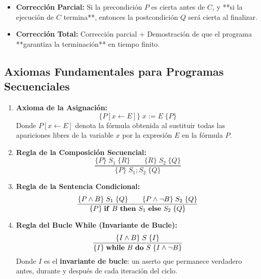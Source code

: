 \begin{definicion}
\begin{itemize}[leftmargin=*]
    \item \textbf{Corrección Parcial:} Si la precondición $P$ es cierta antes de $C$, y **si la ejecución de $C$ termina**, entonces la postcondición $Q$ será cierta al finalizar.
    \item \textbf{Corrección Total:} Corrección parcial + Demostración de que el programa **garantiza la terminación** en tiempo finito.
\end{itemize}
\end{definicion}

\subsection{Axiomas Fundamentales para Programas Secuenciales}
\begin{enumerate}[leftmargin=*]
    \item \textbf{Axioma de la Asignación:}
    \begin{equation}
    \{P[x \leftarrow E]\} \; x := E \; \{P\}
    \end{equation}
    Donde $P[x \leftarrow E]$ denota la fórmula obtenida al sustituir todas las apariciones libres de la variable $x$ por la expresión $E$ en la fórmula $P$.
    
    \item \textbf{Regla de la Composición Secuencial:}
    \begin{equation}
    \frac{\{P\} \; S_1 \; \{R\} \quad\quad \{R\} \; S_2 \; \{Q\}}{\{P\} \; S_1; S_2 \; \{Q\}}
    \end{equation}
    
    \item \textbf{Regla de la Sentencia Condicional:}
    \begin{equation}
    \frac{\{P \land B\} \; S_1 \; \{Q\} \quad\quad \{P \land \neg B\} \; S_2 \; \{Q\}}{\{P\} \; \text{\textbf{if} } B \text{ \textbf{then} } S_1 \text{ \textbf{else} } S_2 \; \{Q\}}
    \end{equation}
    
    \item \textbf{Regla del Bucle While (Invariante de Bucle):}
    \begin{equation}
    \frac{\{I \land B\} \; S \; \{I\}}{\{I\} \; \text{\textbf{while} } B \text{ \textbf{do} } S \; \{I \land \neg B\}}
    \end{equation}
    Donde $I$ es el \textbf{invariante de bucle}: un aserto que permanece verdadero antes, durante y después de cada iteración del ciclo.
\end{enumerate}

